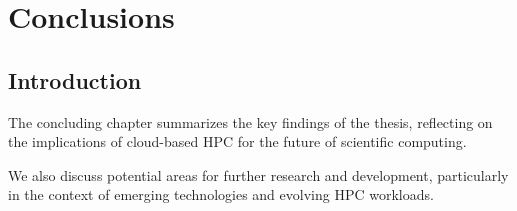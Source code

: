 

\chapter{Conclusions}

\section{Introduction}

The concluding chapter summarizes the key findings of the thesis, reflecting on the implications of cloud-based HPC for the future of scientific computing. 

We also discuss potential areas for further research and development, particularly in the context of emerging technologies and evolving HPC workloads.
